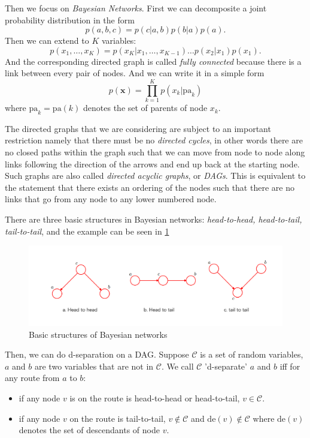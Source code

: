 \documentclass{article}
\newcommand{\mrm}{\mathrm}
\newcommand{\mbf}{\mathbf}
\newcommand{\mcal}{\mathcal}
\newcommand{\xx}{\mbf x}
\begin{document}
Then we focus on \emph{Bayesian Networks}. First we can decomposite a joint probability distribution in the form 
\begin{equation}
    p(a, b, c) = p(c|a, b)p(b|a)p(a).
\end{equation}
Then we can extend to $K$ variables:
\begin{equation}
    p(x_1,\dots, x_K) = p(x_K|x_1,\dots,x_{K-1})\dots p(x_2|x_1)p(x_1). 
\end{equation}
And the corresponding directed graph is called \emph{fully connected} because there is a link between every pair of nodes. And we can write it in a simple form
\begin{equation}
    p(\xx) = \prod_{k=1}^Kp(x_k|\mrm{pa}_k)
\end{equation}
where $\mrm{pa}_k = \mrm{pa}(k)$ denotes the set of parents of node $x_k$. 

The directed graphs that we are considering are subject to an important restriction namely that there must be no \textit{directed cycles}, in other words there are no closed paths within the graph such that we can move from node to node along links following the direction of the arrows and end up back at the starting node. Such graphs are also called \textit{directed acyclic graphs}, or \textit{DAGs}. This is equivalent to the statement that there exists an ordering of the nodes such that there are no links that go from any node to any lower numbered node.

There are three basic structures in Bayesian networks: \emph{head-to-head, head-to-tail, tail-to-tail}, and the example can be seen in \ref{fig6.1}
\begin{figure}[H]
    \centering
    \includegraphics[width=\textwidth]{./figures/fig6_1.png}
    \caption{Basic structures of Bayesian networks}
    \label{fig6.1}
\end{figure}

Then, we can do d-separation on a DAG. Suppose $\mcal C$ is a set of random variables, $a$ and $b$ are two variables that are not in $\mcal C$. We call $\mcal C$ 'd-separate' $a$ and $b$ iff for any route from $a$ to $b$:
\begin{itemize}
    \item if any node $v$ is on the route is head-to-head or head-to-tail, $v\in \mcal C$.
    \item if any node $v$ on the route is tail-to-tail, $v\notin \mcal C$ and $\mrm{de}(v)\notin \mcal C$ where $\mrm{de}(v)$ denotes the set of descendants of node $v$. 
\end{itemize}
\end{document}
